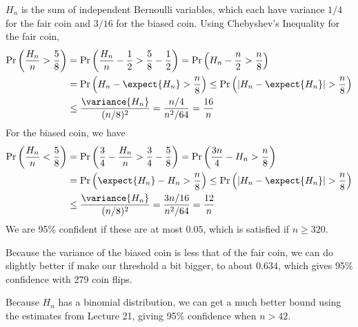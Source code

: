 \begin{problem}
\begin{problemparts}
{$H_n$ is the sum of independent Bernoulli variables, 
which each have variance $1/4$ for the fair coin 
and $3/16$ for the biased coin. 
Using Chebyshev's Inequality for the fair coin, 
\begin{align*}
\Pr\left(\frac{H_n}{n} > \frac{5}{8} \right) 
        & = \Pr\left(\frac{H_n}{n} - \frac{1}{2} > \frac{5}{8} - \frac{1}{2}\right) 
          = \Pr\left(H_n - \frac{n}{2} > \frac{n}{8} \right) \\
        & = \Pr\left(H_n - \expect{H_n} > \frac{n}{8} \right) 
          \leq \Pr\left(|H_n - \expect{H_n}| > \frac{n}{8} \right) \\
        & \leq \frac{\variance{H_n}}{(n/8)^2} 
          = \frac{n/4}{n^2/64} 
          = \frac{16}{n}
\end{align*}
For the biased coin, we have
\begin{align*}
\Pr\left(\frac{H_n}{n} < \frac{5}{8} \right) 
        & = \Pr\left(\frac{3}{4} - \frac{H_n}{n} > \frac{3}{4} - \frac{5}{8}\right) 
          = \Pr\left(\frac{3n}{4} - H_n > \frac{n}{8} \right) \\
        & = \Pr\left(\expect{H_n} - H_n > \frac{n}{8} \right) 
          \leq \Pr\left(|H_n - \expect{H_n}| > \frac{n}{8} \right) \\
        & \leq \frac{\variance{H_n}}{(n/8)^2} 
          = \frac{3n/16}{n^2/64} 
          = \frac{12}{n}
\end{align*}
We are 95\% confident if these are at most $0.05$, 
which is satisfied if $n \geq 320$. 

Because the variance of the biased coin is less that of the fair coin, 
we can do slightly better if make our threshold 
a bit bigger, to about $0.634$, 
which gives 95\% confidence with 279 coin flips. 

Because $H_n$ has a binomial distribution, 
we can get a much better bound using the estimates 
from Lecture 21, 
giving 95\% confidence when $n > 42$. 
}

\end{problemparts}
\end{problem}

%




